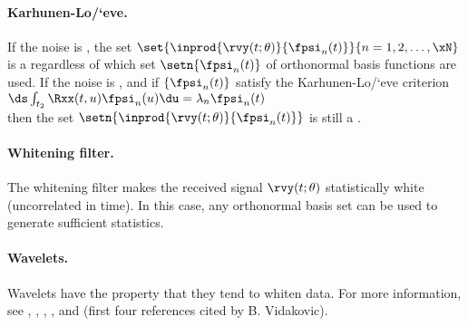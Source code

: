 \paragraph{Karhunen-Lo/`eve.}
If the noise is , the set $\set{\inprod{\rvy(t;\theta)}{\fpsi_n(t)}}{n=1,2,\ldots,\xN}$
is a  regardless of which
set $\setn{\fpsi_n(t)}$ of orthonormal basis functions are used.
If the noise is , and if $\{\fpsi_n(t)\}$ satisfy the
Karhunen-Lo/`eve criterion
\\\indentx$\ds\int_{t_2}\Rxx(t,u)\fpsi_n(u)\du = \lambda_n \fpsi_n(t)$\\
then the set $\setn{\inprod{\rvy(t;\theta)}{\fpsi_n(t)}}$ is still a .

\paragraph{Whitening filter.}
The whitening filter makes the received signal $\rvy(t;\theta)$ statistically white
(uncorrelated in time). In this case,
any orthonormal basis set can be used to generate sufficient statistics.

\paragraph{Wavelets.}
Wavelets have the property that they tend to whiten data. 
For more information, see 
,
,
,
, and
(first four references cited by B. Vidakovic).

